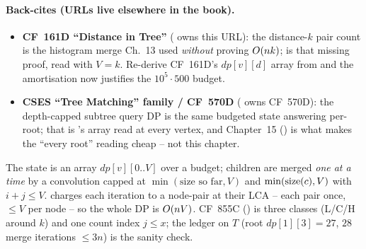 \paragraph{Back-cites (URLs live elsewhere in the book).}
\begin{itemize}[nosep,leftmargin=1.4em]
  \item \textbf{CF~161D ``Distance in Tree''} ( owns this URL): the
        distance-$k$ pair count is the histogram merge Ch.~13 used \emph{without}
        proving $O(nk)$;  is that missing proof, read
        with $V = k$. Re-derive CF~161D's $\mathit{dp}[v][d]$ array from
         and the amortisation now justifies the $10^5 \cdot 500$
        budget.
  \item \textbf{CSES ``Tree Matching'' family / CF~570D} ( owns
        CF~570D): the depth-capped subtree query DP is the same budgeted state
        answering per-root; that is 's array read at every
        vertex, and Chapter~15 () is what makes the ``every root''
        reading cheap -- not this chapter.
\end{itemize}

\begin{recallbox}
The state is an array $\mathit{dp}[v][0..V]$ over a budget; children are merged
\emph{one at a time} by a convolution capped at $\min(\text{size so far},V)$ and
$\min(\operatorname{size}(c),V)$ with $i+j\le V$.  charges each iteration
to a node-pair at their LCA -- each pair once, $\le V$ per node -- so the whole
DP is $O(nV)$. CF~855C () is three classes (L/C/H
around $k$) and one count index $j\le x$; the ledger on $T$ (root $\mathit{dp}[1][3]=27$,
$28$ merge iterations $\le 3n$) is the sanity check.
\end{recallbox}
